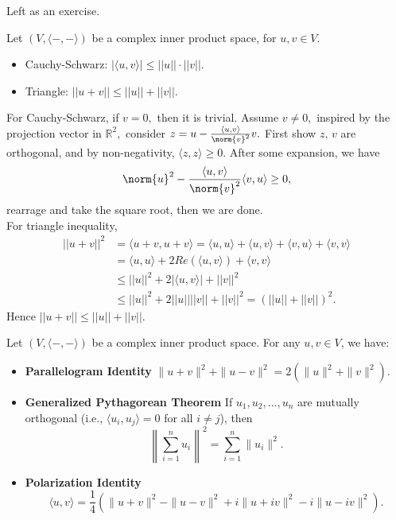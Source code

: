 \begin{pfbox}
    Left as an exercise.
\end{pfbox}

\begin{theorem}
    Let $(V,\langle-,-\rangle)$ be a complex inner product space, for $u,v\in V$.
    \begin{itemize}
        \item Cauchy-Schwarz: $|\langle u,v\rangle| \le ||u||\cdot||v||$.
        \item Triangle: $||u+v||\le||u||+||v||$.
    \end{itemize}
\end{theorem}

\begin{pfbox}
    For Cauchy-Schwarz, if $v=0,$ then it is trivial. Assume $v\neq 0,$ inspired by the projection vector in $\mathbb{R}^2,$ consider $z=u-\frac{\langle u, v\rangle}{\norm{v}^2}v.$
    First show $z,\,v$ are orthogonal, and by non-negativity, $\langle z,z\rangle\ge 0.$ After some expansion, we have
    $$\norm{u}^2-\frac{\langle u, v\rangle}{\norm{v}^2}\langle v, u\rangle \ge 0,$$
    rearrage and take the square root, then we are done.\\ 

    For triangle inequality,
    \begin{align*}
        ||u+v||^{2} &= \langle u+v,u+v\rangle = \langle u,u\rangle+\langle u,v\rangle+\langle v,u\rangle+\langle v,v\rangle \\
        &= \langle u,u\rangle+2Re(\langle u,v\rangle)+\langle v,v\rangle \\
        &\le ||u||^{2}+2|\langle u,v\rangle|+||v||^{2} \\
        &\le ||u||^{2}+2||u||||v||+||v||^{2} = (||u||+||v||)^{2}.
    \end{align*}
    Hence $||u+v||\le||u||+||v||$.
\end{pfbox}


\begin{theorem}
    Let $(V,\langle-,-\rangle)$ be a complex inner product space. For any $u,v\in V$, we have:
    \begin{itemize}
        \item \textbf{Parallelogram Identity} $\|u+v\|^2 + \|u-v\|^2 = 2(\|u\|^2 + \|v\|^2)$.
        \item \textbf{Generalized Pythagorean Theorem} If $u_1, u_2, \dots, u_n$ are mutually orthogonal (i.e., $\langle u_i, u_j\rangle = 0$ for all $i \neq j$), then 
        $$ \left\| \sum_{i=1}^n u_i \right\|^2 = \sum_{i=1}^n \|u_i\|^2. $$
        \item \textbf{Polarization Identity} 
        $$ \langle u,v\rangle = \frac{1}{4} \left( \|u+v\|^2 - \|u-v\|^2 + i\|u+iv\|^2 - i\|u-iv\|^2 \right). $$
    \end{itemize}
\end{theorem}

